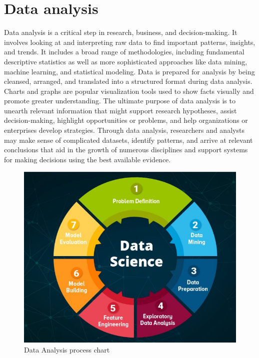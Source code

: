 \documentclass[a4paper,12pt]{report}%
\renewcommand{\\}{\vspace*{0.5\baselineskip} \newline}
\begin{document}
\section{Data analysis}
Data analysis is a critical step in research, business, and decision-making. It involves looking at and interpreting raw data to find important patterns, insights, and trends. It includes a broad range of methodologies, including fundamental descriptive statistics as well as more sophisticated approaches like data mining, machine learning, and statistical modeling. Data is prepared for analysis by being cleansed, arranged, and translated into a structured format during data analysis. Charts and graphs are popular visualization tools used to show facts visually and promote greater understanding.
The ultimate purpose of data analysis is to unearth relevant information that might support research hypotheses, assist decision-making, highlight opportunities or problems, and help organizations or enterprises develop strategies. Through data analysis, researchers and analysts may make sense of complicated datasets, identify patterns, and arrive at relevant conclusions that aid in the growth of numerous disciplines and support systems for making decisions using the best available evidence.

\begin{figure}[h]
\centering
	\includegraphics[scale=0.8]{images/data analysis.png}\\
	\begin{footnotesize}
		\caption{Data Analysis process chart\cite{12}}
		\label{data analysis}
	\end{footnotesize}
\end{figure}
\end{document}
